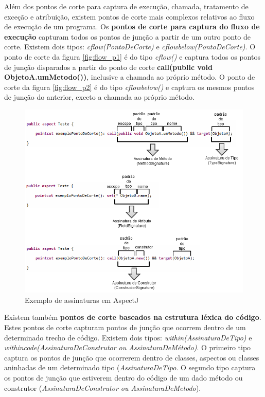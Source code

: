 Além dos pontos de corte para captura de execução, chamada, tratamento de exceção e atribuição, existem pontos de corte mais complexos relativos ao
fluxo de execução de um programa. Os \textbf{pontos de corte para captura do fluxo de execução} capturam todos os pontos de junção a partir de um outro ponto de
corte. Existem dois tipos: \textit{cflow(PontoDeCorte)} e \textit{cflowbelow(PontoDeCorte)}. O ponto de corte da figura \ref{fig:flow_p1}
é do tipo \textit{cflow()} e captura todos os pontos de junção disparados a partir do ponto de corte \textbf{call(public void ObjetoA.umMetodo())},
inclusive a chamada ao próprio método. O ponto de corte da figura \ref{fig:flow_p2} é do tipo \textit{cflowbelow()} e captura os mesmos pontos de
junção do anterior, exceto a chamada ao próprio método.

\begin{figure}[!htb]
	\centering
	\includegraphics[scale=0.9]{img/signatures.png}
	\caption{Exemplo de assinaturas em AspectJ}\label{fig:signatures}
\end{figure}

Existem também \textbf{pontos de corte baseados na estrutura léxica do código}. Estes pontos de corte capturam pontos de junção que ocorrem dentro de
um determinado trecho de código. Existem dois tipos: \textit{within(AssinaturaDeTipo)} e \textit{withincode(AssinaturaDeConstrutor ou
AssinaturaDeMétodo)}. O primeiro tipo captura os pontos de junção que ocorrerem dentro de classes, aspectos ou classes aninhadas de um determinado
tipo (\textit{AssinaturaDeTipo}. O segundo tipo captura os pontos de junção que estiverem dentro do código de um dado método ou construtor
(\textit{AssinaturaDeConstrutor ou AssinaturaDeMetodo}). 

